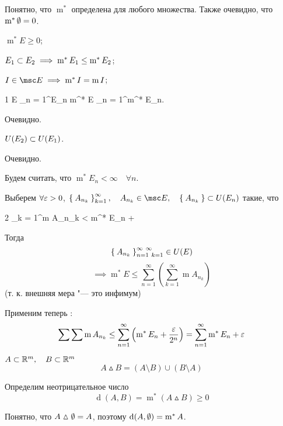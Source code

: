 Понятно, что $ \operatorname m^* $ определена для любого множества. Также очевидно, что $ \operatorname m^* \emptyset = 0 $.

\begin{props}
	\item $ \operatorname m^* E \ge 0 $;
	\item $ E_1 \subset E_2 \implies \operatorname m^* E_1 \le \operatorname m^* E_2 $;
	\item $ I \in \msc E \implies \operatorname m^* I = \operatorname m I $;
	\item
	\begin{equ}1
		E \sub \bigcup_{n = 1}^\infty E_n \implies \operatorname m^* E \le \sum_{n = 1}^\infty \operatorname m^* E_n.
	\end{equ}
\end{props}

\begin{eproof}
	\item Очевидно.
	\item $ U(E_2) \subset U(E_1) $.
	\item Очевидно.
	\item Будем считать, что $ \operatorname m^* E_n < \infty \quad \forall n $.

	Выберем $ \forall \varepsilon > 0 $, $ \set{A_{n_k}}_{k = 1}^\infty, \quad A_{n_k} \in \msc E, \quad \set{A_{n_k}} \sub U(E_n) $ такие, что
	\begin{equ}2
		\sum_{k = 1}^\infty \operatorname m A_{n_k} < \operatorname m^* E_n + \frac\veps{2^n}
	\end{equ}
	Тогда
	$$ \Set{A_{n_k}}_{n = 1~k = 1}^{\infty~\infty} \in U(E) $$
	$$ \implies \operatorname m^* E \le \sum_{n = 1}^\infty \left( \sum_{k = 1}^\infty \operatorname mA_{n_k} \right) $$
	(т. к. внешняя мера "--- это инфимум)

	Применим теперь \eref2:
	$$ \sum \sum \operatorname m A_{n_k} \le \sum_{n = 1}^\infty \left( \operatorname m^* E_n + \frac{} \right) = \sum_{n = 1}^\infty \operatorname m^* E_n + \veps $$
\end{eproof}

\begin{remind}
	$ A \subset \mathbb{R}^m, \quad B \subset \mathbb{R}^m $
	$$ A \vartriangle B = (A \setminus B) \cup (B \setminus A) $$
\end{remind}

Определим неотрицательное число
$$ \operatorname d(A, B) = \operatorname m^* (A \vartriangle B) \ge 0 $$

Понятно, что $ A \vartriangle \emptyset = A $, поэтому $ \operatorname d(A, \emptyset) = \operatorname m^* A $.


